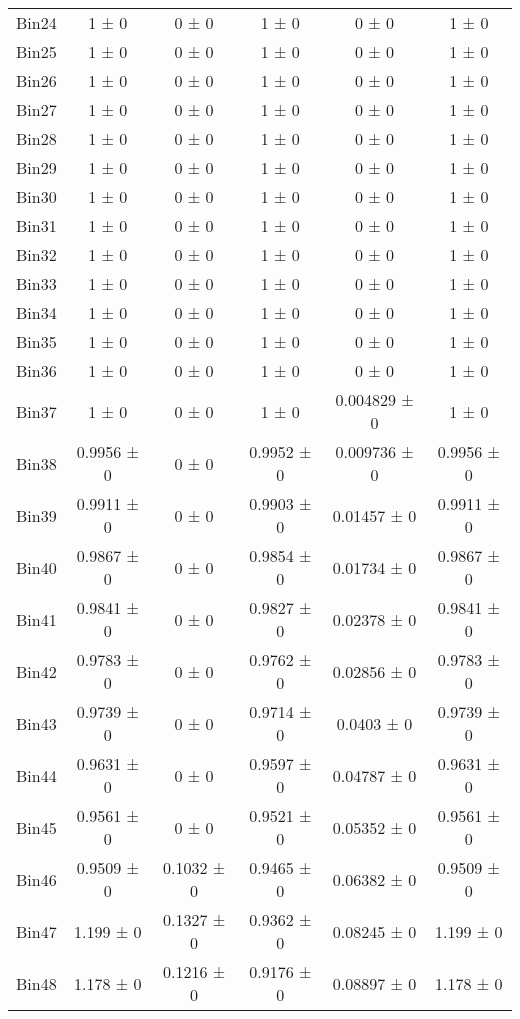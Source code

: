\begin{tabular}{@{\extracolsep{4pt}}lccccc@{}}
     Bin24 & 1 ± 0 & 0 ± 0 & 1 ± 0 & 0 ± 0 & 1 ± 0 \\ 
     Bin25 & 1 ± 0 & 0 ± 0 & 1 ± 0 & 0 ± 0 & 1 ± 0 \\ 
     Bin26 & 1 ± 0 & 0 ± 0 & 1 ± 0 & 0 ± 0 & 1 ± 0 \\ 
     Bin27 & 1 ± 0 & 0 ± 0 & 1 ± 0 & 0 ± 0 & 1 ± 0 \\ 
     Bin28 & 1 ± 0 & 0 ± 0 & 1 ± 0 & 0 ± 0 & 1 ± 0 \\ 
     Bin29 & 1 ± 0 & 0 ± 0 & 1 ± 0 & 0 ± 0 & 1 ± 0 \\ 
     Bin30 & 1 ± 0 & 0 ± 0 & 1 ± 0 & 0 ± 0 & 1 ± 0 \\ 
     Bin31 & 1 ± 0 & 0 ± 0 & 1 ± 0 & 0 ± 0 & 1 ± 0 \\ 
     Bin32 & 1 ± 0 & 0 ± 0 & 1 ± 0 & 0 ± 0 & 1 ± 0 \\ 
     Bin33 & 1 ± 0 & 0 ± 0 & 1 ± 0 & 0 ± 0 & 1 ± 0 \\ 
     Bin34 & 1 ± 0 & 0 ± 0 & 1 ± 0 & 0 ± 0 & 1 ± 0 \\ 
     Bin35 & 1 ± 0 & 0 ± 0 & 1 ± 0 & 0 ± 0 & 1 ± 0 \\ 
     Bin36 & 1 ± 0 & 0 ± 0 & 1 ± 0 & 0 ± 0 & 1 ± 0 \\ 
     Bin37 & 1 ± 0 & 0 ± 0 & 1 ± 0 & 0.004829 ± 0 & 1 ± 0 \\ 
     Bin38 & 0.9956 ± 0 & 0 ± 0 & 0.9952 ± 0 & 0.009736 ± 0 & 0.9956 ± 0 \\ 
     Bin39 & 0.9911 ± 0 & 0 ± 0 & 0.9903 ± 0 & 0.01457 ± 0 & 0.9911 ± 0 \\ 
     Bin40 & 0.9867 ± 0 & 0 ± 0 & 0.9854 ± 0 & 0.01734 ± 0 & 0.9867 ± 0 \\ 
     Bin41 & 0.9841 ± 0 & 0 ± 0 & 0.9827 ± 0 & 0.02378 ± 0 & 0.9841 ± 0 \\ 
     Bin42 & 0.9783 ± 0 & 0 ± 0 & 0.9762 ± 0 & 0.02856 ± 0 & 0.9783 ± 0 \\ 
     Bin43 & 0.9739 ± 0 & 0 ± 0 & 0.9714 ± 0 & 0.0403 ± 0 & 0.9739 ± 0 \\ 
     Bin44 & 0.9631 ± 0 & 0 ± 0 & 0.9597 ± 0 & 0.04787 ± 0 & 0.9631 ± 0 \\ 
     Bin45 & 0.9561 ± 0 & 0 ± 0 & 0.9521 ± 0 & 0.05352 ± 0 & 0.9561 ± 0 \\ 
     Bin46 & 0.9509 ± 0 & 0.1032 ± 0 & 0.9465 ± 0 & 0.06382 ± 0 & 0.9509 ± 0 \\ 
     Bin47 & 1.199 ± 0 & 0.1327 ± 0 & 0.9362 ± 0 & 0.08245 ± 0 & 1.199 ± 0 \\ 
     Bin48 & 1.178 ± 0 & 0.1216 ± 0 & 0.9176 ± 0 & 0.08897 ± 0 & 1.178 ± 0 \\ 

\end{tabular}
